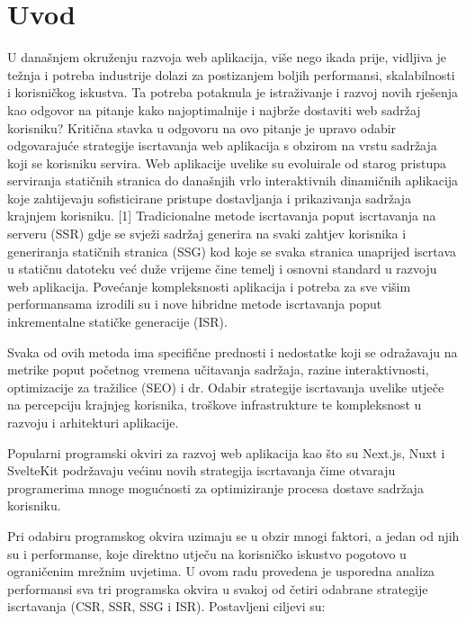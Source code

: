 \section{Uvod}

U današnjem okruženju razvoja web aplikacija, više nego ikada prije, vidljiva je težnja i potreba industrije dolazi  za postizanjem boljih performansi, skalabilnosti i korisničkog iskustva. Ta potreba potaknula je istraživanje i razvoj novih rješenja kao odgovor na pitanje kako najoptimalnije i najbrže dostaviti web sadržaj korisniku? Kritična stavka u odgovoru na ovo pitanje je upravo odabir odgovarajuće strategije iscrtavanja web aplikacija s obzirom na vrstu sadržaja koji se korisniku servira. Web aplikacije uvelike su evoluirale od starog pristupa serviranja statičnih stranica do današnjih vrlo interaktivnih dinamičnih aplikacija koje zahtijevaju sofisticirane pristupe dostavljanja i prikazivanja sadržaja krajnjem korisniku. [1] Tradicionalne metode iscrtavanja poput iscrtavanja na serveru (SSR) gdje se svježi sadržaj generira na svaki zahtjev korisnika i generiranja statičnih stranica (SSG) kod koje se svaka stranica unaprijed iscrtava u statičnu datoteku već duže vrijeme čine temelj i osnovni standard u razvoju web aplikacija. Povećanje kompleksnosti aplikacija i potreba za sve višim performansama izrodili su i nove hibridne metode iscrtavanja poput inkrementalne statičke generacije (ISR).

\bigskip

Svaka od ovih metoda ima specifične prednosti i nedostatke koji se odražavaju na metrike poput početnog vremena učitavanja sadržaja, razine interaktivnosti, optimizacije za tražilice (SEO) i dr. Odabir strategije iscrtavanja uvelike utječe na percepciju krajnjeg korisnika, troškove infrastrukture te kompleksnost u razvoju i arhitekturi aplikacije.

\bigskip

Popularni programski okviri za razvoj web aplikacija kao što su Next.js, Nuxt i SvelteKit podržavaju većinu novih strategija iscrtavanja čime otvaraju programerima mnoge mogućnosti za optimiziranje procesa dostave sadržaja korisniku.

\bigskip

Pri odabiru programskog okvira uzimaju se u obzir mnogi faktori, a jedan od njih su i performanse, koje direktno utječu na korisničko iskustvo pogotovo u ograničenim mrežnim uvjetima.
U ovom radu provedena je usporedna analiza performansi sva tri programska okvira u svakoj od  četiri odabrane strategije iscrtavanja (CSR, SSR, SSG i ISR). Postavljeni ciljevi su:

